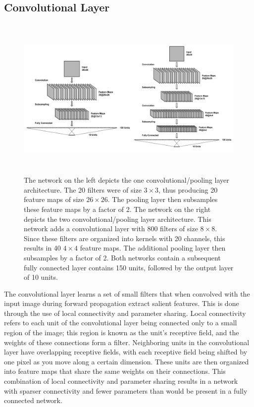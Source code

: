 \documentclass[10pt,twocolumn,letterpaper]{article}
\begin{document}
\subsection{Convolutional Layer}

\begin{figure}
  \includegraphics[width=\textwidth,height=8cm]{botharcs}
  \caption{The network on the left depicts the one convolutional/pooling layer architecture. The 20 
  filters were of size $3 \times 3$, thus producing 20 feature maps of size $26 \times 26$. The pooling layer 
  then subsamples these feature maps by a factor of 2. The network on the right depicts the two convolutional/pooling layer
  architecture. This network adds a convolutional layer with 800 filters of size $8 \times 8$. Since these filters
  are organized into kernels with 20 channels, this results in 40 $4 \times 4$ feature maps. The additional pooling
  layer then subsamples by a factor of 2. Both networks contain a subsequent fully connected layer contains 150 units,
  followed by the output layer of 10 units.}
  \label{fig:convarcs}
\end{figure}

The convolutional layer learns a set of small filters that when convolved with the input image
during forward propagation extract salient features. This is done through the use of local
connectivity and parameter sharing. Local connectivity refers to each unit of the convolutional
layer being connected only to a small region of the image; this region is known as the unit’s
receptive field, and the weights of these connections form a filter. Neighboring units in the
convolutional layer have overlapping receptive fields, with each receptive field being shifted
by one pixel as you move along a certain dimension. These units are then organized into feature
maps that share the same weights on their connections. This combination of local connectivity
and parameter sharing results in a network with sparser connectivity and fewer parameters than
would be present in a fully connected network.
\end{document}
